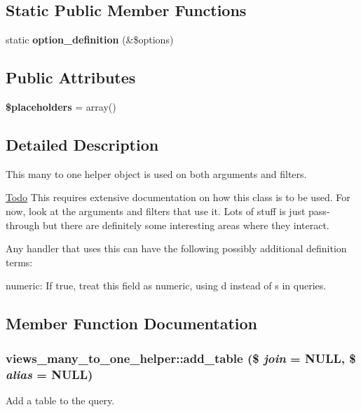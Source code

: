 \subsection*{Static Public Member Functions}
\begin{DoxyCompactItemize}
\item 
\hypertarget{classviews__many__to__one__helper_ad2626cf8f80c88ff1665b95db7845879}{
static {\bfseries option\_\-definition} (\&\$options)}
\label{classviews__many__to__one__helper_ad2626cf8f80c88ff1665b95db7845879}

\end{DoxyCompactItemize}
\subsection*{Public Attributes}
\begin{DoxyCompactItemize}
\item 
\hypertarget{classviews__many__to__one__helper_af6c91b7adad9bf8fab065060875f613d}{
{\bfseries \$placeholders} = array()}
\label{classviews__many__to__one__helper_af6c91b7adad9bf8fab065060875f613d}

\end{DoxyCompactItemize}


\subsection{Detailed Description}
This many to one helper object is used on both arguments and filters.

\begin{Desc}
\item[\hyperlink{todo__todo000080}{Todo}]This requires extensive documentation on how this class is to be used. For now, look at the arguments and filters that use it. Lots of stuff is just pass-\/through but there are definitely some interesting areas where they interact.\end{Desc}
Any handler that uses this can have the following possibly additional definition terms:
\begin{DoxyItemize}
\item numeric: If true, treat this field as numeric, using d instead of s in queries. 
\end{DoxyItemize}

\subsection{Member Function Documentation}
\hypertarget{classviews__many__to__one__helper_a0d8f88cfcc6bbb792c0fd0b3e1f42882}{
\subsubsection[{add\_\-table}]{\setlength{\rightskip}{0pt plus 5cm}views\_\-many\_\-to\_\-one\_\-helper::add\_\-table (\$ {\em join} = {\ttfamily NULL}, \/  \$ {\em alias} = {\ttfamily NULL})}}
\label{classviews__many__to__one__helper_a0d8f88cfcc6bbb792c0fd0b3e1f42882}
Add a table to the query.

